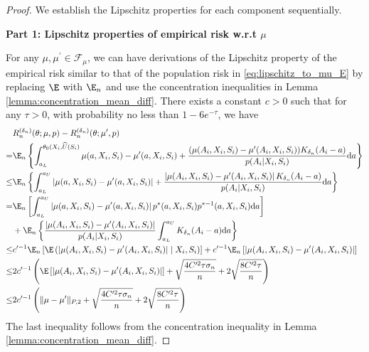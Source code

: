 \begin{proof}
    We establish the Lipschitz properties for each component sequentially.
    
    \noindent \textbf{Part 1: Lipschitz properties of empirical risk w.r.t $\mu$}
    
    \noindent \noindent For any $\mu,\mu^\prime\in \mathcal{F}_{\mu}$, we can have derivations of the Lipschitz property of the empirical risk similar to that of the population risk in \eqref{eq:lipschitz_to_mu_E} by replacing $\E$ with $\E_n$ and use the concentration inequalities in Lemma \ref{lemma:concentration_mean_diff}. There exists a constant $c>0$ such that for any $\tau>0$, with  probability no less than $1-6e^{-\tau}$, we have
\begin{align}
    &R_n^{({\delta_n})}(\theta;\mu, p) - R_n^{({\delta_n})}(\theta;\mu^\prime, p)\nonumber\\
     =  & \E_n\left\{\int_{a_L}^{\theta_0(X_i,\widehat U(S_i)}\mu(a,X_i,S_i) - \mu^\prime(a,X_i,S_i) + \frac{(\mu(A_i,X_i,S_i)- \mu^\prime(A_i,X_i,S_i))K_{\delta_n}(A_i-a)}{ p(A_{i}|X_{i},S_{i})}\mathrm{d}a\right\}\nonumber\\
     \leq  & \E_n\left\{\int_{a_L}^{a_U}\left|\mu(a,X_i,S_i) - \mu^\prime(a,X_i,S_i)\right| + \frac{\left|\mu(A_i,X_i,S_i)- \mu^\prime(A_i,X_i,S_i)\right|K_{\delta_n}(A_i-a)}{ p(A_{i}|X_{i},S_{i})}\mathrm{d}a\right\}\nonumber\\
     = & \E_n\left[\int_{a_L}^{a_U}\left|\mu(a,X_i,S_i) - \mu^\prime(a,X_i,S_i)\right|p^*(a,X_i,S_i)p^{*-1}(a,X_i,S_i)\mathrm{d}a\right]\nonumber\\
     & + \E_n\left\{\frac{\left|\mu(A_i,X_i,S_i)- \mu^\prime(A_i,X_i,S_i)\right|}{ p(A_{i}|X_{i},S_{i})}\int_{a_L}^{a_U}K_{\delta_n}(A_i-a)\mathrm{d}a\right\}\nonumber\\
     \leq &c^{\prime-1}\E_n\left[\E\left(|\mu(A_i,X_i,S_i)-\mu^\prime(A_i,X_i,S_i)|\mid X_i,S_i\right)\right] + c^{\prime-1}\E_n\left[|\mu(A_i,X_i,S_i)-\mu^\prime(A_i,X_i,S_i)|\right]\nonumber\\
     \leq &2c^{\prime-1}\left(\E\left[|\mu(A_i,X_i,S_i)-\mu^\prime(A_i,X_i,S_i)|\right] +  \sqrt{\frac{4C^{\prime2}\tau\sigma_n}{n}} + 2\sqrt{\frac{8C^{\prime2}\tau}{n}}\right)\nonumber\\
     \leq & 2c^{\prime-1}\left(\|\mu-\mu^\prime\|_{P,2} + \sqrt{\frac{4C^{\prime2}\tau\sigma_n}{n}} + 2\sqrt{\frac{8C^{\prime2}\tau}{n}}\right)
\label{eq:lipschitz_to_mu_En}
\end{align}
The last inequality follows from the concentration inequality in Lemma \ref{lemma:concentration_mean_diff}.


\end{proof}
